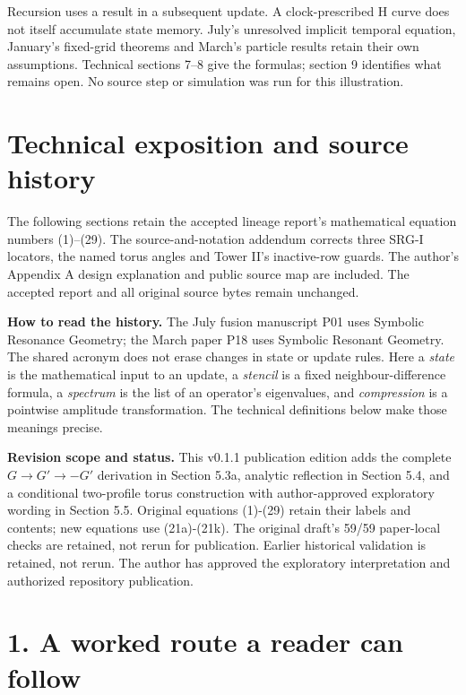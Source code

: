 \documentclass[11pt,a4paper]{article}
\begin{document}
Recursion uses a result in a subsequent update. A clock-prescribed H
curve does not itself accumulate state memory.
July's unresolved implicit temporal equation, January's fixed-grid theorems
and March's particle results retain their own assumptions.
Technical sections 7--8 give the formulas; section 9 identifies what remains open.
No source step or simulation was run for this illustration.
\clearpage

\section*{Technical exposition and source history}
The following sections retain the accepted lineage report's mathematical
equation numbers (1)--(29). The source-and-notation addendum corrects three
SRG-I locators, the named torus angles and Tower II's inactive-row guards.
The author's Appendix A design explanation and public source map are included.
The accepted report and all original source bytes remain unchanged.

\textbf{How to read the history.}
The July fusion manuscript P01 uses Symbolic Resonance Geometry;
the March paper P18 uses Symbolic Resonant Geometry.
The shared acronym does not erase changes in state or update rules.
Here a \emph{state} is the mathematical input to an update, a
\emph{stencil} is a fixed neighbour-difference formula, a
\emph{spectrum} is the list of an operator's eigenvalues, and
\emph{compression} is a pointwise amplitude transformation.
The technical definitions below make those meanings precise.

\tableofcontents
\clearpage
\textbf{Revision scope and status.} This v0.1.1 publication edition adds the complete $G\to G'\to-G'$ derivation in Section 5.3a, analytic reflection in Section 5.4, and a conditional two-profile torus construction with author-approved exploratory wording in Section 5.5. Original equations (1)-(29) retain their labels and contents; new equations use (21a)-(21k). The original draft's 59/59 paper-local checks are retained, not rerun for publication. Earlier historical validation is retained, not rerun. The author has approved the exploratory interpretation and authorized repository publication.

\section*{1. A worked route a reader can follow}
\end{document}
